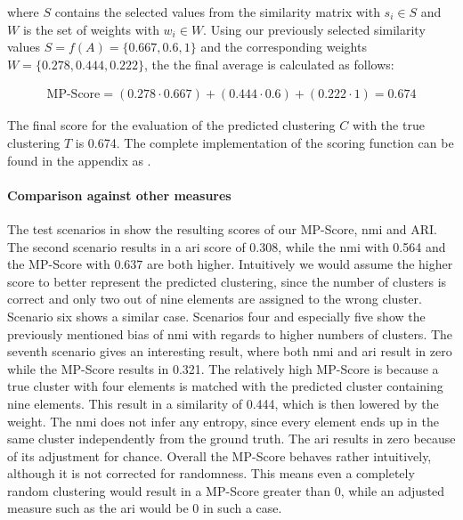 where $S$ contains the selected values from the similarity matrix
with $s_{i} \in S$ and $W$ is the set of weights with $w_i \in W$.
Using our previously selected similarity values $S = f(A) = \{0.667, 0.6, 1\}$
and the corresponding weights $W = \{0.278, 0.444, 0.222\}$,
the the final average is calculated as follows:

\begin{align*}
    \text{MP-Score} = (0.278 \cdot 0.667) + (0.444 \cdot 0.6) + (0.222 \cdot 1) = \mathbf{0.674}
\end{align*}

The final score for the evaluation of the predicted clustering $C$ with the true clustering $T$ is 0.674.
The complete implementation of the scoring function can be found in the appendix as .

\paragraph{Comparison against other measures}
The test scenarios in  show the resulting scores of our MP-Score, \gls{nmi} and ARI.
The second scenario results in a \gls{ari} score of 0.308,
while the \gls{nmi} with 0.564 and the MP-Score with 0.637 are both higher.
Intuitively we would assume the higher score to better represent the predicted clustering,
since the number of clusters is correct and only two out of nine elements are assigned to the wrong cluster.
Scenario six shows a similar case.
Scenarios four and especially five show the previously mentioned bias of \gls{nmi} with regards to higher numbers of clusters.
The seventh scenario gives an interesting result,
where both \gls{nmi} and \gls{ari} result in zero while the MP-Score results in 0.321.
The relatively high MP-Score is because a true cluster with four elements is matched
with the predicted cluster containing nine elements.
This result in a similarity of 0.444, which is then lowered by the weight.
The \gls{nmi} does not infer any entropy, since every element ends up in the same cluster independently from the ground truth.
The \gls{ari} results in zero because of its adjustment for chance.
Overall the MP-Score behaves rather intuitively, although it is not corrected for randomness.
This means even a completely random clustering would result in a MP-Score greater than 0,
while an adjusted measure such as the \gls{ari} would be 0 in such a case.

